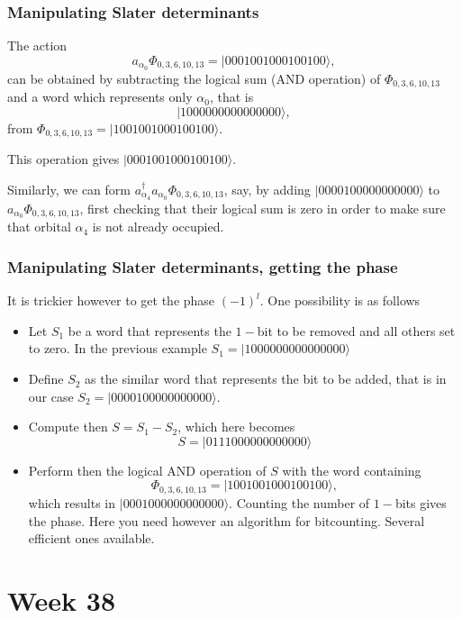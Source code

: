 \documentclass[compress]{beamer}
\begin{document}
\frame
{
  \frametitle{Manipulating Slater determinants}
\begin{small}
{\scriptsize
The action
\[
a_{\alpha_0}\Phi_{0,3,6,10,13} = |0001001000100100\rangle,
\]
can be obtained by subtracting the logical sum (AND operation) of $\Phi_{0,3,6,10,13}$ and 
a word which represents only $\alpha_0$, that is
\[
|1000000000000000\rangle,
\]  
from $\Phi_{0,3,6,10,13}= |1001001000100100\rangle$.

This operation gives $|0001001000100100\rangle$. 

Similarly, we can form $a^\dagger_{\alpha_4}a_{\alpha_0}\Phi_{0,3,6,10,13}$, say, by adding 
$|0000100000000000\rangle$ to $a_{\alpha_0}\Phi_{0,3,6,10,13}$, first checking that their logical sum
is zero in order to make sure that orbital $\alpha_4$ is not already occupied. 
}
\end{small}
}


\frame
{
  \frametitle{Manipulating Slater determinants, getting the phase}
\begin{small}
{\scriptsize
It is trickier however to get the phase $(-1)^l$. 
One possibility is as follows
\begin{itemize}
\item Let $S_1$ be a word that represents the $1-$bit to be removed and all others set to zero.
In the previous example $S_1=|1000000000000000\rangle$
\item Define $S_2$ as the similar word that represents the bit to be added, that is in our case
$S_2=|0000100000000000\rangle$.
\item Compute then $S=S_1-S_2$, which here becomes
\[
S=|0111000000000000\rangle
\]
\item Perform then the logical AND operation of $S$ with the word containing 
\[
\Phi_{0,3,6,10,13} = |1001001000100100\rangle,
\]
which results in $|0001000000000000\rangle$. Counting the number of $1-$bits gives the phase.  Here you need however an algorithm for bitcounting. Several efficient ones available. 
\end{itemize}
}
\end{small}
}



\section[Week 38]{Week 38}
\end{document}
